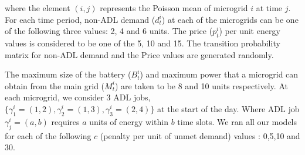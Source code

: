 where the element $(i,j)$ represents the Poisson mean of microgrid $i$ at time $j$.
For each time period, non-ADL demand ($d_t^i$) at each of the microgrids can be one of the following  three values: 2, 4 and 6 units. The price ($p_t^i$) per unit energy values is considered to be one of the 5, 10 and 15. 
The transition probability matrix for non-ADL demand and the Price values are generated randomly.

%
The maximum size of the battery ($B_t^i$) and maximum power that a microgrid can obtain from the main grid ($M_t^i$) are taken to be 8 and 10 units respectively.
At each microgrid, we consider 3 ADL jobs, $\{\gamma_{1}^{i} =  (1,2), \gamma_{2}^{i} =  (1,3),  \gamma_{3}^{i} =  (2,4)\}$ at the start of the day. Where ADL job $\gamma_{j}^{i} =  (a,b)$ requires $a$ units of energy within $b$ time slots. %
We ran all our models for each of the following $c$ (penalty per unit of unmet demand) values : 0,5,10 and 30.
